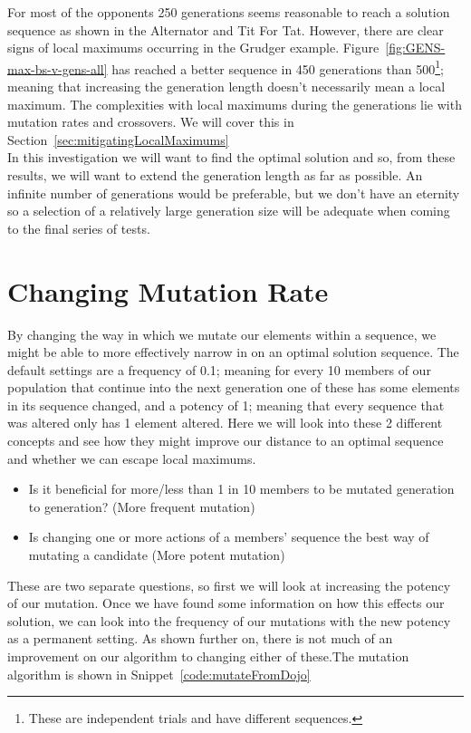 For most of the opponents 250 generations seems reasonable to reach a solution sequence as shown in the Alternator and Tit For Tat.
However, there are clear signs of local maximums occurring in the Grudger example.
Figure~\ref{fig:GENS-max-bs-v-gens-all} has reached a better sequence in 450 generations than 500\footnote{These are independent trials and have different sequences.}; meaning that increasing the generation length doesn't necessarily mean a local maximum.
The complexities with local maximums during the generations lie with mutation rates and crossovers.
We will cover this in Section~\ref{sec:mitigatingLocalMaximums}\\

In this investigation we will want to find the optimal solution and so, from these results, we will want to extend the generation length as far as possible.
An infinite number of generations would be preferable, but we don't have an eternity so a selection of a relatively large generation size will be adequate when coming to the final series of tests.\\

\section{Changing Mutation Rate}\label{sec:changeingmutationrate}
By changing the way in which we mutate our elements within a sequence, we might be able to more effectively narrow in on an optimal solution sequence.
The default settings are a frequency of 0.1; meaning for every 10 members of our population that continue into the next generation one of these has some elements in its sequence changed, and a potency of 1;
meaning that every sequence that was altered only has 1 element altered.
Here we will look into these 2 different concepts and see how they might improve our distance to an optimal sequence and whether we can escape local maximums.
\begin{itemize}
    \item Is it beneficial for more/less than 1 in 10 members to be mutated generation to generation? (More frequent mutation)
    \item Is changing one or more actions of a members' sequence the best way of mutating a candidate (More potent mutation)
\end{itemize}

These are two separate questions, so first we will look at increasing the potency of our mutation.
Once we have found some information on how this effects our solution, we can look into the frequency of our mutations with the new potency as a permanent setting.
As shown further on, there is not much of an improvement on our algorithm to changing either of these.The mutation algorithm is shown in Snippet~\ref{code:mutateFromDojo}\\

